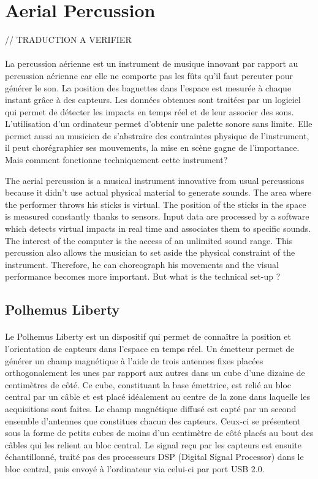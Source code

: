 \section{Aerial Percussion}
// TRADUCTION A VERIFIER
\paragraph{}
La percussion aérienne est un instrument de musique innovant par rapport au percussion aérienne car elle ne comporte pas les fûts qu'il faut percuter pour générer le son. La position des baguettes dans l'espace est mesurée à chaque instant grâce à des capteurs. Les données obtenues sont traitées par un logiciel qui permet de détecter les impacts en temps réel et de leur associer des sons. L'utilisation d'un ordinateur permet d'obtenir une palette sonore sans limite. Elle permet aussi au musicien de s'abstraire des contraintes physique de l'instrument, il peut chorégraphier ses mouvements, la mise en scène gagne de l'importance.
Mais comment fonctionne techniquement cette instrument?

The aerial percussion is a musical instrument innovative from usual percussions because it didn't use actual physical material to generate sounds. The area where the performer throws his sticks is virtual. The position of the sticks in the space is measured constantly thanks to sensors. Input data are processed by a software which detects virtual impacts in real time and associates them to specific sounds. The interest of the computer is the access of an unlimited sound range. This percussion also allows the musician to set aside the physical constraint of the instrument. Therefore, he can choreograph his movements and the visual performance becomes more important.
But what is the technical set-up ?
\subsection{Polhemus Liberty}

\paragraph{}
Le Polhemus Liberty est un dispositif qui permet de connaître la position et l'orientation de capteurs dans l'espace en temps réel. Un émetteur permet de générer un champ magnétique à l'aide de trois antennes fixes placées orthogonalement les unes par rapport aux autres dans un cube d'une dizaine de centimètres de côté. Ce cube, constituant la base émettrice, est relié au bloc central par un câble et est placé idéalement au centre de la zone dans laquelle les acquisitions sont faites. Le champ magnétique diffusé est capté par un second ensemble d'antennes que constitues chacun des capteurs. Ceux-ci se présentent sous la forme de petits cubes de moins d'un centimètre de côté placés au bout des câbles qui les relient au bloc central. Le signal reçu par les capteurs est ensuite échantillonné, traité pas des processeurs DSP (Digital Signal Processor) dans le bloc central, puis envoyé à l'ordinateur via celui-ci par port USB 2.0.


